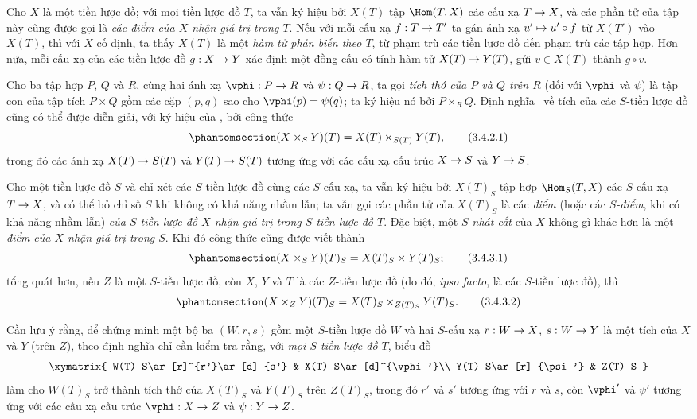 \documentclass[oneside]{amsart}
\makeatletter
\newcommand{\ega@arrow}[2]{\mathchoice{#1}{#2}{#2}{#2}}
\let\ega@shortmapsto\mapsto
\renewcommand{\to}{\ega@arrow{\longrightarrow}{\rightarrow}}
\renewcommand{\mapsto}{\ega@arrow{\longmapsto}{\ega@shortmapsto}}
\newcommand{\oldpage}[2][]{{\marginnote{\normalfont\textbf{#1}~|~#2}}\ignorespaces}
\let\EGAOriginalLabel\label
\renewcommand{\label}[1]{\phantomsection\EGAOriginalLabel{#1}}
\makeatother
\begin{document}
\begin{env}[3.4.1]
\label{I.3.4.1}
Cho $X$ là một tiền lược đồ; với mọi tiền lược đồ $T$, ta vẫn ký hiệu bởi
$X(T)$ tập $\Hom(T,X)$ các cấu xạ $T\to X$, và các phần tử của tập này cũng
được gọi là \emph{các điểm của $X$ nhận giá trị trong $T$}. Nếu với mỗi cấu
xạ $f:T\to T'$ ta gán ánh xạ $u'\mapsto u'\circ f$ từ $X(T')$ vào $X(T)$,
thì với $X$ cố định, ta thấy $X(T)$ là một \emph{hàm tử phản biến theo $T$},
từ phạm trù các tiền lược đồ đến phạm trù các tập hợp. Hơn nữa, mỗi cấu xạ
của các tiền lược đồ $g:X\to Y$ xác định một đồng cấu có tính hàm tử
$X(T)\to Y(T)$, gửi $v\in X(T)$ thành $g\circ v$.
\end{env}

\begin{env}[3.4.2]
\label{I.3.4.2}
Cho ba tập hợp $P$, $Q$ và $R$, cùng hai ánh xạ $\vphi:P\to R$ và
$\psi:Q\to R$, ta gọi \emph{tích thớ của $P$ và $Q$ trên $R$} (đối với
$\vphi$ và $\psi$) là tập con của
\oldpage[I]{112}
tập tích $P\times Q$ gồm các cặp $(p,q)$ sao cho $\vphi(p)=\psi(q)$; ta ký
hiệu nó bởi $P\times_R Q$. Định nghĩa~ về tích của các
$S$-tiền lược đồ cũng có thể được diễn giải, với ký hiệu của
, bởi công thức
\[
\label{I.3.4.2.1}
  (X\times_S Y)(T)=X(T)\times_{S(T)}Y(T),
  \tag{3.4.2.1}
\]
trong đó các ánh xạ $X(T)\to S(T)$ và $Y(T)\to S(T)$ tương ứng với các cấu
xạ cấu trúc $X\to S$ và $Y\to S$.
\end{env}

\begin{env}[3.4.3]
\label{I.3.4.3}
Cho một tiền lược đồ $S$ và chỉ xét các $S$-tiền lược đồ cùng các $S$-cấu xạ,
ta vẫn ký hiệu bởi $X(T)_S$ tập hợp $\Hom_S(T,X)$ các $S$-cấu xạ $T\to X$,
và có thể bỏ chỉ số $S$ khi không có khả năng nhầm lẫn; ta vẫn gọi các phần tử
của $X(T)_S$ là các \emph{điểm} (hoặc các \emph{$S$-điểm}, khi có khả năng
nhầm lẫn) \emph{của $S$-tiền lược đồ $X$ nhận giá trị trong $S$-tiền lược đồ
$T$}. Đặc biệt, một \emph{$S$-nhát cắt} của $X$ không gì khác hơn là một
\emph{điểm của $X$ nhận giá trị trong $S$}. Khi đó công thức
 cũng được viết thành
\[
\label{I.3.4.3.1}
  (X\times_S Y)(T)_S=X(T)_S\times Y(T)_S;
  \tag{3.4.3.1}
\]
tổng quát hơn, nếu $Z$ là một $S$-tiền lược đồ, còn $X$, $Y$ và $T$ là các
$Z$-tiền lược đồ (do đó, \emph{ipso facto}, là các $S$-tiền lược đồ), thì
\[
\label{I.3.4.3.2}
  (X\times_Z Y)(T)_S=X(T)_S\times_{Z(T)_S}Y(T)_S.
  \tag{3.4.3.2}
\]

Cần lưu ý rằng, để chứng minh một bộ ba $(W,r,s)$ gồm một $S$-tiền lược đồ
$W$ và hai $S$-cấu xạ $r:W\to X$, $s:W\to Y$ là một tích của $X$ và $Y$
(trên $Z$), theo định nghĩa chỉ cần kiểm tra rằng, với \emph{mọi $S$-tiền
lược đồ $T$}, biểu đồ
\[
  \xymatrix{
    W(T)_S\ar[r]^{r'}\ar[d]_{s'} &
    X(T)_S\ar[d]^{\vphi'}\\
    Y(T)_S\ar[r]_{\psi'} &
    Z(T)_S
  }
\]
làm cho $W(T)_S$ trở thành tích thớ của $X(T)_S$ và $Y(T)_S$ trên $Z(T)_S$,
trong đó $r'$ và $s'$ tương ứng với $r$ và $s$, còn $\vphi'$ và $\psi'$ tương
ứng với các cấu xạ cấu trúc $\vphi:X\to Z$ và $\psi:Y\to Z$.
\end{env}
\end{document}
